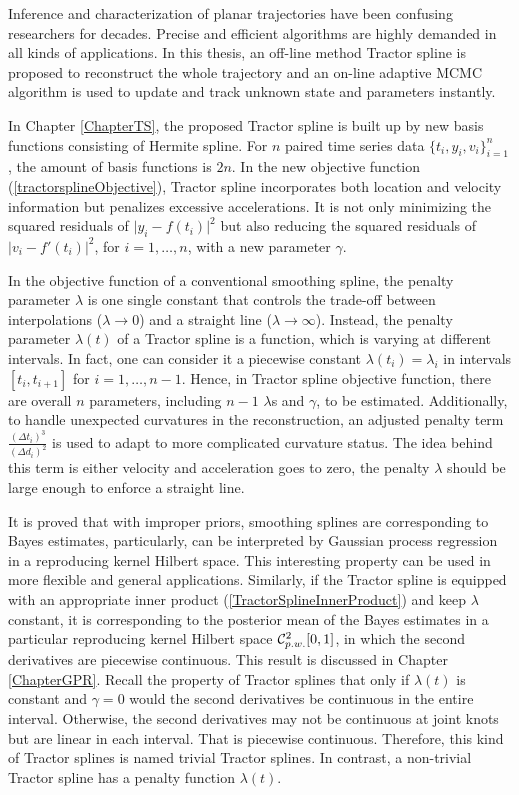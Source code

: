 
Inference and characterization of planar trajectories have been confusing researchers for decades. Precise and efficient algorithms are highly demanded in all kinds of applications. In this thesis, an off-line method Tractor spline is proposed to reconstruct the whole trajectory and an on-line adaptive MCMC algorithm is used to update and track unknown state and parameters instantly. 

In Chapter \ref{ChapterTS}, the proposed Tractor spline is built up by new basis functions consisting of Hermite spline. For $n$ paired time series data $\{t_i,y_i,v_i\}_{i=1}^{n}$, the amount of basis functions is $2n$. In the new objective function (\ref{tractorsplineObjective}), Tractor spline incorporates both location and velocity information but penalizes excessive accelerations. It is not only minimizing the squared residuals of $\lvert y_i-f(t_i)\rvert^2$ but also reducing the squared residuals of $\lvert v_i-f'(t_i)\rvert^2$, for $i=1,\ldots,n$, with a new parameter $\gamma$. 

In the objective function of a conventional smoothing spline, the penalty parameter $\lambda$ is one single constant that controls the trade-off between interpolations ($\lambda\to 0$) and a straight line ($\lambda\to \infty$). Instead, the penalty parameter $\lambda(t)$ of a Tractor spline is a function, which is varying at different intervals. In fact, one can consider it a piecewise constant $\lambda(t_i)=\lambda_i$ in intervals $[t_i,t_{i+1}]$ for $i=1,\ldots,n-1$. Hence, in Tractor spline objective function, there are overall $n$ parameters, including $n-1$ $\lambda$s and $\gamma$, to be estimated. Additionally, to handle unexpected curvatures in the reconstruction, an adjusted penalty term $\frac{(\Delta t_i)^3}{(\Delta d_i)^2}$ is used to adapt to more complicated curvature status. The idea behind this term is either velocity and acceleration goes to zero, the penalty $\lambda$ should be large enough to enforce a straight line. 

It is proved that with improper priors, smoothing splines are corresponding to Bayes estimates, particularly, can be interpreted by Gaussian process regression in a reproducing kernel Hilbert space. This interesting property can be used in more flexible and general applications. Similarly, if the Tractor spline is equipped with an appropriate inner product (\ref{TractorSplineInnerProduct}) and keep $\lambda$ constant, it is corresponding to the posterior mean of the Bayes estimates in a particular reproducing kernel Hilbert space $\mathcal{C}_{\footnotesize p.w.}^2[0,1]$, in which the second derivatives are piecewise continuous. This result is discussed in Chapter \ref{ChapterGPR}. Recall the property of Tractor splines that only if $\lambda(t)$ is constant and $\gamma=0$ would the second derivatives be continuous in the entire interval. Otherwise, the second derivatives may not be continuous at joint knots but are linear in each interval. That is piecewise continuous. Therefore, this kind of Tractor splines is named trivial Tractor splines. In contrast, a non-trivial Tractor spline has a penalty function $\lambda(t)$. 

